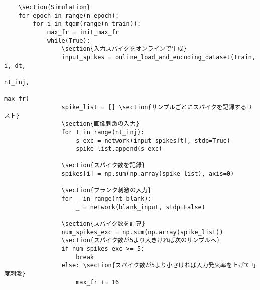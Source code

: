 \begin{verbatim}
    \section{Simulation}
    for epoch in range(n_epoch):
        for i in tqdm(range(n_train)):
            max_fr = init_max_fr
            while(True):
                \section{入力スパイクをオンラインで生成}
                input_spikes = online_load_and_encoding_dataset(train, i, dt,
                                                                nt_inj,
                                                                max_fr)
                spike_list = [] \section{サンプルごとにスパイクを記録するリスト}
                \section{画像刺激の入力}
                for t in range(nt_inj):
                    s_exc = network(input_spikes[t], stdp=True)
                    spike_list.append(s_exc)
                
                \section{スパイク数を記録}
                spikes[i] = np.sum(np.array(spike_list), axis=0)
                
                \section{ブランク刺激の入力}
                for _ in range(nt_blank):
                    _ = network(blank_input, stdp=False)
    
                \section{スパイク数を計算}
                num_spikes_exc = np.sum(np.array(spike_list))
                \section{スパイク数が5より大きければ次のサンプルへ}
                if num_spikes_exc >= 5:
                    break
                else: \section{スパイク数が5より小さければ入力発火率を上げて再度刺激}
                    max_fr += 16
        

\end{verbatim}
